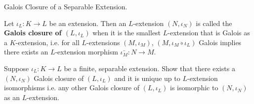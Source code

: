 \documentclass[../book.tex]{subfiles}
\begin{document}
\begin{ex} Galois Closure of a Separable Extension.
    
    Let $\iota_L : K \to L$ be an extension.
    Then an $L$-extension $(N,\iota_N)$ is called 
    the \textbf{Galois closure of $(L,\iota_L)$} 
    when it is the smallest $L$-extension that is Galois as a $K$-extension,
    i.e. for all $L$-extensions $(M,\iota_M)$,
    $(M,\iota_M\circ\iota_L)$ Galois implies
    there exists an $L$-extension morphism $\bar{\iota_M} : N \to M$. 
    
    Suppose $\iota_L : K \to L$ be a finite, separable extension. 
    Show that there exists a $(N,\iota_N)$ Galois closure of $(L,\iota_L)$
    and it is unique up to $L$-extension isomorphisms i.e.
    any other Galois closure of $(L,\iota_L)$ is isomorphic to $(N,\iota_N)$
    as an $L$-extension. 
    
\end{ex}
\end{document}
